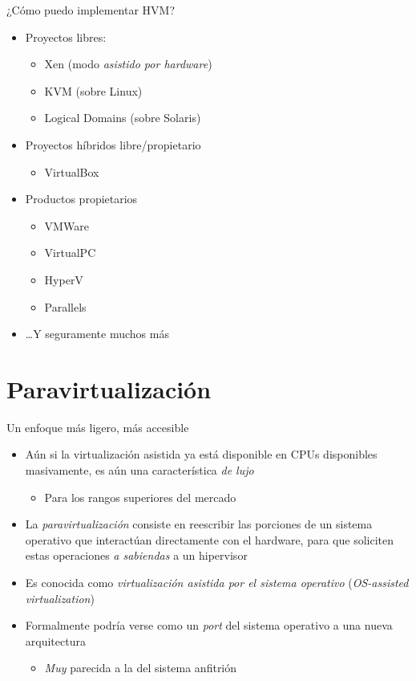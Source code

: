 \documentclass[presentation]{beamer}
\begin{document}
\begin{frame}[label={sec:org5e2f88a}]{¿Cómo puedo implementar HVM?}
\begin{itemize}
\item Proyectos libres:
\begin{itemize}
\item Xen (modo \emph{asistido por hardware})
\item KVM (sobre Linux)
\item Logical Domains (sobre Solaris)
\end{itemize}
\item Proyectos híbridos libre/propietario
\begin{itemize}
\item VirtualBox
\end{itemize}
\item Productos propietarios
\begin{itemize}
\item VMWare
\item VirtualPC
\item HyperV
\item Parallels
\end{itemize}
\item \ldots{}Y seguramente muchos más
\end{itemize}
\end{frame}

\section{Paravirtualización}
\label{sec:orgf0cb503}
\begin{frame}[label={sec:org1ba0bca}]{Un enfoque más ligero, más accesible}
\begin{itemize}
\item Aún si la virtualización asistida ya está disponible en CPUs
disponibles masivamente, es aún una característica \emph{de lujo}
\begin{itemize}
\item Para los rangos superiores del mercado
\end{itemize}
\item La \emph{paravirtualización} consiste en reescribir las porciones de un
sistema operativo que interactúan directamente con el hardware,
para que soliciten estas operaciones \emph{a sabiendas} a un hipervisor
\item Es conocida como \emph{virtualización asistida por el sistema operativo}
(\emph{OS-assisted virtualization})
\item Formalmente podría verse como un \emph{port} del sistema operativo a una
nueva arquitectura
\begin{itemize}
\item \emph{Muy} parecida a la del sistema anfitrión
\end{itemize}
\end{itemize}
\end{frame}
\end{document}
